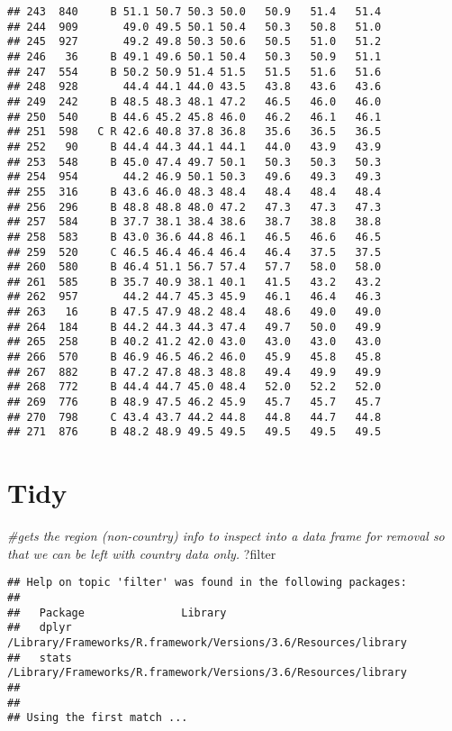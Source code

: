 \documentclass[]{article}
\newenvironment{Shaded}{\begin{snugshade}}{\end{snugshade}}
\newcommand{\CommentTok}[1]{\textcolor[rgb]{0.56,0.35,0.01}{\textit{#1}}}
\newcommand{\NormalTok}[1]{#1}
\begin{document}
\begin{verbatim}
## 243  840     B 51.1 50.7 50.3 50.0   50.9   51.4   51.4
## 244  909       49.0 49.5 50.1 50.4   50.3   50.8   51.0
## 245  927       49.2 49.8 50.3 50.6   50.5   51.0   51.2
## 246   36     B 49.1 49.6 50.1 50.4   50.3   50.9   51.1
## 247  554     B 50.2 50.9 51.4 51.5   51.5   51.6   51.6
## 248  928       44.4 44.1 44.0 43.5   43.8   43.6   43.6
## 249  242     B 48.5 48.3 48.1 47.2   46.5   46.0   46.0
## 250  540     B 44.6 45.2 45.8 46.0   46.2   46.1   46.1
## 251  598   C R 42.6 40.8 37.8 36.8   35.6   36.5   36.5
## 252   90     B 44.4 44.3 44.1 44.1   44.0   43.9   43.9
## 253  548     B 45.0 47.4 49.7 50.1   50.3   50.3   50.3
## 254  954       44.2 46.9 50.1 50.3   49.6   49.3   49.3
## 255  316     B 43.6 46.0 48.3 48.4   48.4   48.4   48.4
## 256  296     B 48.8 48.8 48.0 47.2   47.3   47.3   47.3
## 257  584     B 37.7 38.1 38.4 38.6   38.7   38.8   38.8
## 258  583     B 43.0 36.6 44.8 46.1   46.5   46.6   46.5
## 259  520     C 46.5 46.4 46.4 46.4   46.4   37.5   37.5
## 260  580     B 46.4 51.1 56.7 57.4   57.7   58.0   58.0
## 261  585     B 35.7 40.9 38.1 40.1   41.5   43.2   43.2
## 262  957       44.2 44.7 45.3 45.9   46.1   46.4   46.3
## 263   16     B 47.5 47.9 48.2 48.4   48.6   49.0   49.0
## 264  184     B 44.2 44.3 44.3 47.4   49.7   50.0   49.9
## 265  258     B 40.2 41.2 42.0 43.0   43.0   43.0   43.0
## 266  570     B 46.9 46.5 46.2 46.0   45.9   45.8   45.8
## 267  882     B 47.2 47.8 48.3 48.8   49.4   49.9   49.9
## 268  772     B 44.4 44.7 45.0 48.4   52.0   52.2   52.0
## 269  776     B 48.9 47.5 46.2 45.9   45.7   45.7   45.7
## 270  798     C 43.4 43.7 44.2 44.8   44.8   44.7   44.8
## 271  876     B 48.2 48.9 49.5 49.5   49.5   49.5   49.5
\end{verbatim}

\hypertarget{tidy}{%
\section{Tidy}\label{tidy}}

\begin{Shaded}
\begin{Highlighting}[]
\CommentTok{#gets the region (non-country) info to inspect into a data frame for removal so that we can be left with country data only. }
\NormalTok{?filter}
\end{Highlighting}
\end{Shaded}

\begin{verbatim}
## Help on topic 'filter' was found in the following packages:
## 
##   Package               Library
##   dplyr                 /Library/Frameworks/R.framework/Versions/3.6/Resources/library
##   stats                 /Library/Frameworks/R.framework/Versions/3.6/Resources/library
## 
## 
## Using the first match ...
\end{verbatim}
\end{document}
